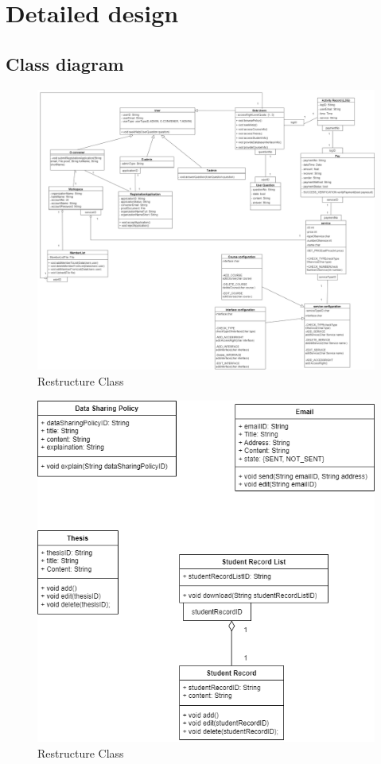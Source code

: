\chapter{Detailed design}
\section{Class diagram}

\begin{figure}[H]
    \centering
    \includegraphics[width=1\linewidth]{picture/3-1/3-1-2A.jpg}
    \caption{Restructure Class}
    \label{fig:enter-label}
\end{figure}

\begin{figure}[H]
    \centering
    \includegraphics[width=0.75\linewidth]{picture/3-1/3-1-2B.jpg}
    \caption{Restructure Class}
    \label{fig:enter-label}
\end{figure}

